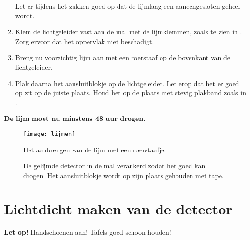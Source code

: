 \begin{enumerate}
    Let er tijdens het zakken goed op dat de lijmlaag een aaneengesloten
    geheel wordt.
    \item Klem de lichtgeleider vast aan de mal met de lijmklemmen,
    zoals te zien in . Zorg ervoor dat het oppervlak
    niet beschadigt.
    \item Breng nu voorzichtig lijm aan met een roerstaaf op de
    bovenkant van de lichtgeleider.
    \item Plak daarna het aansluitblokje op de lichtgeleider. Let erop
    dat het er goed op zit op de juiste plaats. Houd het op de plaats
    met stevig plakband zoals in .
\end{enumerate}

\textbf{De lijm moet nu minstens 48 uur drogen.}

\begin{figure}
    \centering
    \texttt{[image: lijmen]}
    \caption{Het aanbrengen van de lijm met een roerstaafje.}
    \label{fig:lijmen}
\end{figure}

\begin{figure}
    \centering
    \caption{De gelijmde detector in de mal verankerd zodat het goed kan
             drogen. Het aansluitblokje wordt op zijn plaats gehouden
             met tape.}
\end{figure}


\section{Lichtdicht maken van de detector}

\textbf{Let op!} Handschoenen aan! Tafels goed schoon houden!

